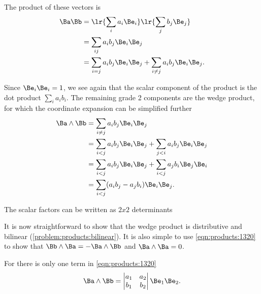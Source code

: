 The product of these vectors is
\begin{equation}\label{eqn:products:1360}
\begin{aligned}
\Ba \Bb
&= \lr{ \sum_i a_i \Be_i } \lr{ \sum_j b_j \Be_j } \\
&= \sum_{ij} a_i b_j \Be_i \Be_j \\
&= \sum_{i = j} a_i b_j \Be_i \Be_j + \sum_{i \ne j} a_i b_j \Be_i \Be_j.
\end{aligned}
\end{equation}

Since \( \Be_i \Be_i = 1 \), we see again that the scalar component of the product is the dot product \( \sum_i a_i b_i \).
The remaining grade 2 components are the wedge product, for which the coordinate expansion can be simplified further
\begin{equation}\label{eqn:products:1460}
\begin{aligned}
\Ba \wedge \Bb
&= \sum_{i \ne j} a_i b_j \Be_i \Be_j \\
&= \sum_{i < j} a_i b_j \Be_i \Be_j + \sum_{j < i} a_i b_j \Be_i \Be_j \\
&= \sum_{i < j} a_i b_j \Be_i \Be_j + \sum_{i < j} a_j b_i \Be_j \Be_i \\
&= \sum_{i < j} (a_i b_j - a_j b_i) \Be_i \Be_j.
\end{aligned}
\end{equation}

The scalar factors can be written as \( 2 x 2 \) determinants

It is now straightforward to show that the wedge product is distributive and bilinear (\cref{problem:products:bilinear}).
It is also simple to use \cref{eqn:products:1320} to show that \( \Bb \wedge \Ba = -\Ba \wedge \Bb \) and \( \Ba \wedge \Ba = 0 \).

For  there is only one term in \cref{eqn:products:1320}
\begin{equation}\label{eqn:products:1720}
\Ba \wedge \Bb
=
\begin{vmatrix}
a_1 & a_2 \\
b_1 & b_2
\end{vmatrix}
\Be_1 \Be_2.
\end{equation}

